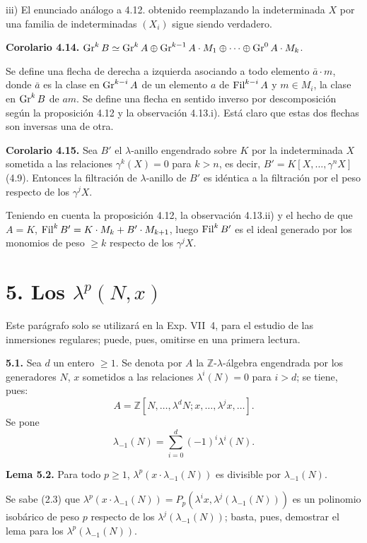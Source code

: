 iii) El enunciado análogo a 4.12. obtenido reemplazando la indeterminada \(X\) por una familia de indeterminadas \((X_i)\) sigue siendo verdadero.

\textbf{Corolario 4.14.} \(\operatorname{Gr}^k B\simeq\operatorname{Gr}^k A\oplus\operatorname{Gr}^{k-1}A\cdot M_1\oplus\cdots\oplus\operatorname{Gr}^0 A\cdot M_k\).

Se define una flecha de derecha a izquierda asociando a todo elemento \(\bar a\cdot m\), donde \(\bar a\) es la clase en \(\operatorname{Gr}^{k-i}A\) de un elemento \(a\) de \(\operatorname{Fil}^{k-i}A\) y \(m\in M_i\), la clase en \(\operatorname{Gr}^k B\) de \(am\). Se define una flecha en sentido inverso por descomposición según la proposición 4.12 y la observación 4.13.i). Está claro que estas dos flechas son inversas una de otra.

\textbf{Corolario 4.15.} Sea \(B'\) el \(\lambda\)-anillo engendrado sobre \(K\) por la indeterminada \(X\) sometida a las relaciones \(\gamma^k(X)=0\) para \(k>n\), es decir, \(B'=K[X,\ldots,\gamma^n X]\) (4.9). Entonces la filtración de \(\lambda\)-anillo de \(B'\) es idéntica a la filtración por el peso respecto de los \(\gamma^j X\).

Teniendo en cuenta la proposición 4.12, la observación 4.13.ii) y el hecho de que \(A=K\), \(\operatorname{Fil}^k B'=K\cdot M_k+B'\cdot M_{k+1}\), luego \(\operatorname{Fil}^k B'\) es el ideal generado por los monomios de peso \(\ge k\) respecto de los \(\gamma^j X\).

\section*{5. Los \(\lambda^p(N,x)\)}

Este parágrafo solo se utilizará en la Exp. VII~4, para el estudio de las inmersiones regulares; puede, pues, omitirse en una primera lectura.

\textbf{5.1.} Sea \(d\) un entero \(\ge1\). Se denota por \(A\) la \(\mathbb Z\)-\(\lambda\)-álgebra engendrada por los generadores \(N\), \(x\) sometidos a las relaciones \(\lambda^i(N)=0\) para \(i>d\); se tiene, pues:
\[
  A=\mathbb Z[N,\ldots,\lambda^dN;
       x,\ldots,\lambda^jx,\ldots].
\]
Se pone
\[
  \lambda_{-1}(N)=\sum_{i=0}^{d}(-1)^i\lambda^i(N).
\]

\textbf{Lema 5.2.} Para todo \(p\ge1\), \(\lambda^p(x\cdot\lambda_{-1}(N))\) es divisible por \(\lambda_{-1}(N)\).

Se sabe (2.3) que \(\lambda^p(x\cdot\lambda_{-1}(N))=P_p(\lambda^i x,\lambda^j(\lambda_{-1}(N)))\) es un polinomio isobárico de peso \(p\) respecto de los \(\lambda^j(\lambda_{-1}(N))\); basta, pues, demostrar el lema para los \(\lambda^p(\lambda_{-1}(N))\).


